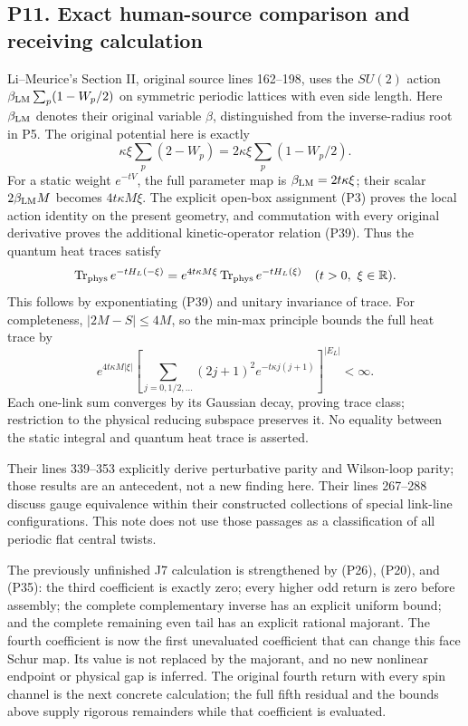 \documentclass[11pt]{article}
\begin{document}
\subsection*{P11. Exact human-source comparison and receiving calculation}

Li–Meurice's Section II, original source lines 162–198, uses the \(SU(2)\) action
\(\beta_{\rm LM}\sum_p(1-W_p/2)\) on symmetric periodic lattices with even side length. Here \(\beta_{\rm LM}\) denotes their original variable \(\beta\), distinguished from the inverse-radius root in P5. The original potential here is exactly
\[
 \kappa\xi\sum_p(2-W_p)=2\kappa\xi\sum_p(1-W_p/2).
\]
For a static weight \(e^{-tV}\), the full parameter map is \(\beta_{\rm LM}=2t\kappa\xi\); their scalar \(2\beta_{\rm LM}M\) becomes \(4t\kappa M\xi\). The explicit open-box assignment (P3) proves the local action identity on the present geometry, and commutation with every original derivative proves the additional kinetic-operator relation (P39). Thus the quantum heat traces satisfy
\[
 \operatorname{Tr}_{\rm phys}e^{-tH_L(-\xi)}
 =e^{4t\kappa M\xi}\operatorname{Tr}_{\rm phys}e^{-tH_L(\xi)}
 \quad(t>0,\ \xi\in\mathbb R).
\]
This follows by exponentiating (P39) and unitary invariance of trace. For completeness, \(|2M-S|\le4M\), so the min-max principle bounds the full heat trace by
\[
 e^{4t\kappa M|\xi|}
 \left[\sum_{j=0,1/2,\ldots}(2j+1)^2e^{-t\kappa j(j+1)}\right]^{|E_L|}<\infty.
\]
Each one-link sum converges by its Gaussian decay, proving trace class; restriction to the physical reducing subspace preserves it. No equality between the static integral and quantum heat trace is asserted.

Their lines 339–353 explicitly derive perturbative parity and Wilson-loop parity; those results are an antecedent, not a new finding here. Their lines 267–288 discuss gauge equivalence within their constructed collections of special link-line configurations. This note does not use those passages as a classification of all periodic flat central twists.

The previously unfinished J7 calculation is strengthened by (P26), (P20), and (P35): the third coefficient is exactly zero; every higher odd return is zero before assembly; the complete complementary inverse has an explicit uniform bound; and the complete remaining even tail has an explicit rational majorant. The fourth coefficient is now the first unevaluated coefficient that can change this face Schur map. Its value is not replaced by the majorant, and no new nonlinear endpoint or physical gap is inferred. The original fourth return with every spin channel is the next concrete calculation; the full fifth residual and the bounds above supply rigorous remainders while that coefficient is evaluated.
\clearpage
\end{document}
